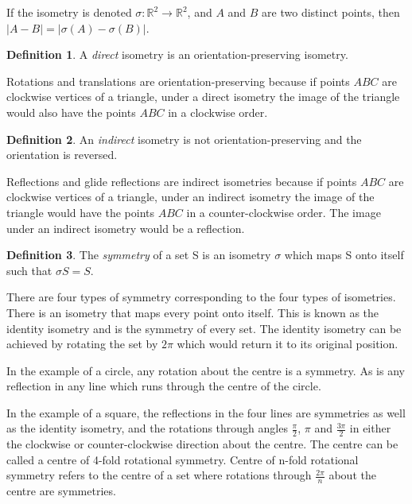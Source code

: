 \documentclass[a4paper,12pt,twoside,abstraction,titlepage]{article}
\theoremstyle{remark}
\theoremstyle{definition}
\newtheorem{definition}{Definition}[section]
\begin{document}
\noindent If the isometry is denoted $\sigma:\mathbb{R}^2 \to \mathbb{R}^2$, and $A$ and $B$ are two distinct points, then $\vert A - B\vert = \vert\sigma(A) - \sigma(B)\vert$.

\begin{definition}
A \emph{direct} isometry is an orientation-preserving isometry.
\end{definition}

\noindent Rotations and translations are orientation-preserving because if points $ABC$ are clockwise vertices of a triangle, under a direct isometry the image of the triangle would also have the points $ABC$ in a clockwise order.~\cite[\S 1.3]{branko}

\begin{definition}
An \emph{indirect} isometry is not orientation-preserving and the orientation is reversed.~\cite{wolfram}
\end{definition}

\noindent Reflections and glide reflections are indirect isometries because if points $ABC$ are clockwise vertices of a triangle, under an indirect isometry the image of the triangle would have the points $ABC$ in a counter-clockwise order. The image under an indirect isometry would be a reflection.~\cite[\S 1.3]{branko}

\begin{definition}
The \emph{symmetry} of a set S is an isometry $\sigma$ which maps S onto itself such that $\sigma S = S$.~\cite[\S 1.3]{branko}
\end{definition}

\noindent There are four types of symmetry corresponding to the four types of isometries. There is an isometry that maps every point onto itself. This is known as the identity isometry and is the symmetry of every set. The identity isometry can be achieved by rotating the set by $2\pi$ which would return it to its original position.

In the example of a circle, any rotation about the centre is a symmetry. As is any reflection in any line which runs through the centre of the circle.

In the example of a square, the reflections in the four lines are symmetries as well as the identity isometry, and the rotations through angles $\frac{\pi}{2}$, $\pi$ and $\frac{3\pi}{2}$ in either the clockwise or counter-clockwise direction about the centre. The centre can be called a centre of 4-fold rotational symmetry. Centre of n-fold rotational symmetry refers to the centre of a set where rotations through $\frac{2\pi}{n}$ about the centre are symmetries.
\end{document}
